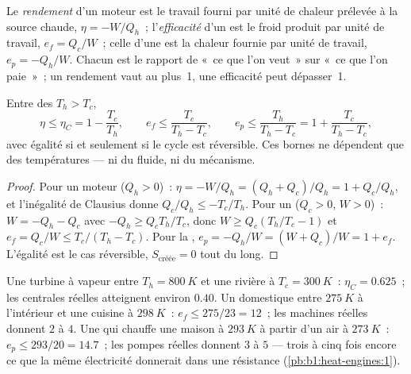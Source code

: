 \begin{definition}\label{def:b1:heat-engines:efficiency}
Le \emph{rendement} d'un moteur est le travail fourni par unité de chaleur
prélevée à la source chaude, $\eta = -W/Q_h$~; l'\emph{efficacité} d'un
 est le froid produit par unité de travail, $e_f = Q_c/W$~;
celle d'une  est la chaleur fournie par unité de travail,
$e_p = -Q_h/W$. Chacun est le rapport de «~ce que l'on veut~» sur «~ce que
l'on paie~»~; un rendement vaut au plus~1, une efficacité peut dépasser~1.
\end{definition}

\begin{theorem}[Carnot]\label{thm:b1:heat-engines:carnot}
Entre des  $T_h > T_c$,
\[
\eta \leq \eta_C = 1 - \frac{T_c}{T_h}, \qquad
e_f \leq \frac{T_c}{T_h - T_c}, \qquad
e_p \leq \frac{T_h}{T_h - T_c} = 1 + \frac{T_c}{T_h - T_c},
\]
avec égalité si et seulement si le cycle est réversible. Ces bornes ne
dépendent que des températures --- ni du fluide, ni du mécanisme.
\end{theorem}

\begin{proof}
Pour un moteur ($Q_h > 0$)~: $\eta = -W/Q_h = (Q_h + Q_c)/Q_h = 1 + Q_c/Q_h$,
et l'inégalité de Clausius donne $Q_c/Q_h \leq -T_c/T_h$. Pour un
 ($Q_c > 0$, $W > 0$)~: $W = -Q_h - Q_c$ avec $-Q_h \geq Q_c T_h/T_c$,
donc $W \geq Q_c(T_h/T_c - 1)$ et $e_f = Q_c/W \leq T_c/(T_h - T_c)$.
Pour la , $e_p = -Q_h/W = (W + Q_c)/W = 1 + e_f$. L'égalité
est le cas réversible, $S_{\text{créée}} = 0$ tout du long.
\end{proof}

\begin{example}\label{ex:b1:heat-engines:numbers}
Une turbine à vapeur entre $T_h = \qty{800}{K}$ et une rivière à
$T_c = \qty{300}{K}$~: $\eta_C = 0.625$~; les centrales réelles atteignent environ $0.40$.
Un  domestique entre $\qty{275}{K}$ à l'intérieur et une cuisine à
$\qty{298}{K}$~: $e_f \leq 275/23 = 12$~; les machines réelles donnent $2$ à $4$.
Une  qui chauffe une maison à $\qty{293}{K}$ à partir d'un air à $\qty{273}{K}$~:
$e_p \leq 293/20 = 14.7$~; les pompes réelles donnent $3$ à $5$ --- trois à
cinq fois encore ce que la même électricité donnerait dans une résistance
(\cref{pb:b1:heat-engines:1}).
\end{example}


